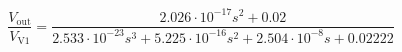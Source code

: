 \begin{equation}
\frac{V_{\mathrm{out}}}{V_{\mathrm{V1}}} = \frac{2.026 \cdot 10^{-17} s^{2} + 0.02}{2.533 \cdot 10^{-23} s^{3} + 5.225 \cdot 10^{-16} s^{2} + 2.504 \cdot 10^{-8} s + 0.02222}
\end{equation}

